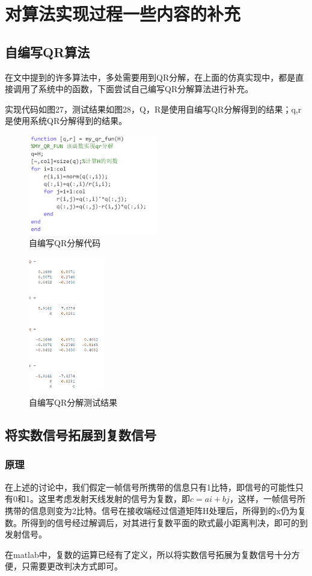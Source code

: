 \documentclass[a4paper,12pt]{article}
\begin{document}
	\section{对算法实现过程一些内容的补充}
	\subsection{自编写QR算法}
	在文中提到的许多算法中，多处需要用到QR分解，在上面的仿真实现中，都是直接调用了系统中的函数，下面尝试自己编写QR分解算法进行补充。\par 
	实现代码如图27，测试结果如图28，Q，R是使用自编写QR分解得到的结果；q,r是使用系统QR分解得到的结果。
	\begin{figure}[h]
		\centering
		\includegraphics[width=0.5\textwidth]{28.png}
		\caption{自编写QR分解代码}
	\end{figure}
	\begin{figure}[h]
		\centering
		\includegraphics[width=0.3\textwidth]{29.png}
		\caption{自编写QR分解测试结果}
	\end{figure}
	\subsection{将实数信号拓展到复数信号}
	\subsubsection{原理}
	在上述的讨论中，我们假定一帧信号所携带的信息只有1比特，即信号的可能性只有0和1。这里考虑发射天线发射的信号为复数，即$c=ai+bj$，这样，一帧信号所携带的信息则变为2比特。信号在接收端经过信道矩阵H处理后，所得到的x仍为复数。所得到的信号经过解调后，对其进行复数平面的欧式最小距离判决，即可的到发射信号。\par 
	在matlab中，复数的运算已经有了定义，所以将实数信号拓展为复数信号十分方便，只需要更改判决方式即可。
\end{document}
